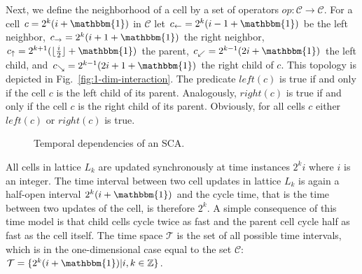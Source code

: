 \documentclass[pre,amssymb,showpacs,showkeys,preprint]{revtex4}
\begin{document}
Next, we define the neighborhood of a cell by a set of operators $\mathit{op}: \mathcal{C} \rightarrow \mathcal{C}$.
For a cell $c = 2^k (i + \mathbbm{1})$ in $\mathcal{C}$ let
$c_{\leftarrow} = 2^k (i - 1 + \mathbbm{1})$ be the left neighbor,
$c_{\rightarrow} = 2^k (i + 1 + \mathbbm{1})$ the right neighbor,
$c_{\uparrow} =  2^{k + 1} (\lfloor \frac{i}{2} \rfloor + \mathbbm{1})$ the parent,
$c_{\swarrow} = 2^{k-1}(2i + \mathbbm{1})$ the left child,
and $c_{\searrow} = 2^{k-1}(2i + 1 + \mathbbm{1})$ the right child of $c$.
This topology is depicted in Fig.~\ref{fig:1-dim-interaction}.
The predicate $\mathit{left}(c)$ is true if and only if the cell $c$ is the left child of its parent.
Analogously, $\mathit{right}(c)$ is true if and only if the cell $c$ is the right child of its parent.
Obviously, for all cells $c$ either $\mathit{left}(c)$ or $\mathit{right}(c)$ is true.

\begin{figure}
\begin{center}
\caption{\label{fig:timeops} Temporal dependencies of an SCA.}
\end{center}
\end{figure}

All cells in lattice $L_k$ are updated synchronously at time instances $2^k i$ where $i$ is an integer.
The time interval between two cell updates in lattice $L_k$ is again a half-open interval $2^k (i + \mathbbm{1})$
and the cycle time, that is the time between two updates of the cell, is therefore $2^k$.
A simple consequence of this time model is that child cells cycle twice as fast and the parent cell cycle
half as fast as the cell itself.
The time space $\mathcal{T}$ is the set of all possible time intervals, which is in the one-dimensional
case equal to the set $\mathcal{C}$: $\mathcal{T} = \{ 2^k (i + \mathbbm{1}) | i, k \in \mathbb Z\}$.
\end{document}
